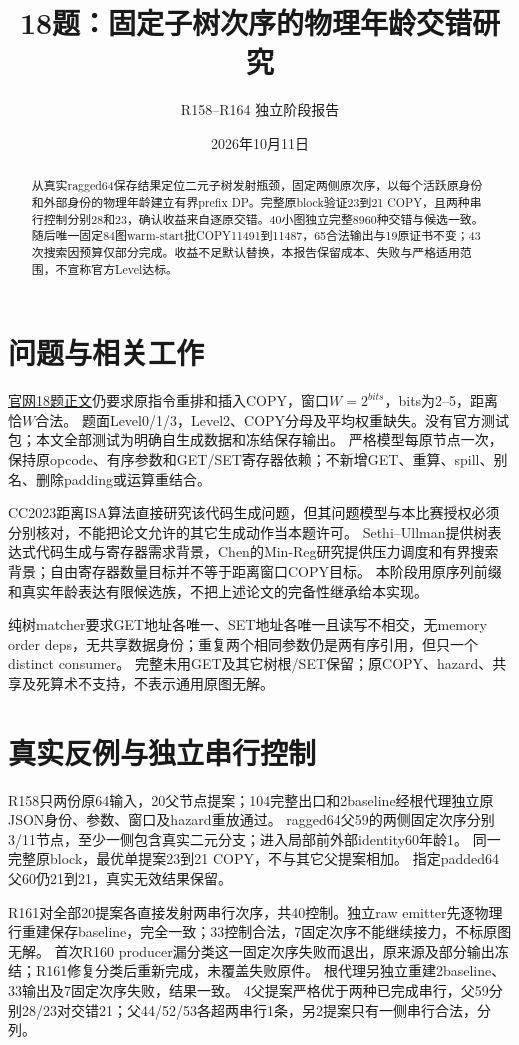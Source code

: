 \documentclass[UTF8,11pt,a4paper]{ctexart}
\title{18题：固定子树次序的物理年龄交错研究}
\author{R158--R164 独立阶段报告}
\date{2026年10月11日}
\begin{document}
\maketitle
\begin{abstract}
从真实ragged64保存结果定位二元子树发射瓶颈，固定两侧原次序，以每个活跃原身份和外部身份的物理年龄建立有界prefix DP。完整原block验证23到21 COPY，且两种串行控制分别28和23，确认收益来自逐原交错。40小图独立完整8960种交错与候选一致。随后唯一固定84图warm-start批COPY11491到11487，65合法输出与19原证书不变；43次搜索因预算仅部分完成。收益不足默认替换，本报告保留成本、失败与严格适用范围，不宣称官方Level达标。
\end{abstract}

\section{问题与相关工作}
\href{https://www.chaspark.com/\#/races/competitions/1326690549003280384}{官网18题正文}仍要求原指令重排和插入COPY，窗口$W=2^{bits}$，bits为2--5，距离恰$W$合法。
题面Level0/1/3，Level2、COPY分母及平均权重缺失。没有官方测试包；本文全部测试为明确自生成数据和冻结保存输出。
严格模型每原节点一次，保持原opcode、有序参数和GET/SET寄存器依赖；不新增GET、重算、spill、别名、删除padding或运算重结合。

CC2023距离ISA算法\cite{sugita}直接研究该代码生成问题，但其问题模型与本比赛授权必须分别核对，不能把论文允许的其它生成动作当本题许可。
Sethi--Ullman\cite{sethi}提供树表达式代码生成与寄存器需求背景，Chen的Min-Reg研究\cite{chen}提供压力调度和有界搜索背景；自由寄存器数量目标并不等于距离窗口COPY目标。
本阶段用原序列前缀和真实年龄表达有限候选族，不把上述论文的完备性继承给本实现。

纯树matcher要求GET地址各唯一、SET地址各唯一且读写不相交，无memory order deps，无共享数据身份；重复两个相同参数仍是两有序引用，但只一个distinct consumer。
完整未用GET及其它树根/SET保留；原COPY、hazard、共享及死算术不支持，不表示通用原图无解。

\section{真实反例与独立串行控制}
R158只两份原64输入，20父节点提案；104完整出口和2baseline经根代理独立原JSON身份、参数、窗口及hazard重放通过。
ragged64父59的两侧固定次序分别3/11节点，至少一侧包含真实二元分支；进入局部前外部identity60年龄1。
同一完整原block，最优单提案23到21 COPY，不与其它父提案相加。
指定padded64父60仍21到21，真实无效结果保留。

R161对全部20提案各直接发射两串行次序，共40控制。独立raw emitter先逐物理行重建保存baseline，完全一致；33控制合法，7固定次序不能继续接力，不标原图无解。
首次R160 producer漏分类这一固定次序失败而退出，原来源及部分输出冻结；R161修复分类后重新完成，未覆盖失败原件。
根代理另独立重建2baseline、33输出及7固定次序失败，结果一致。
4父提案严格优于两种已完成串行，父59分别28/23对交错21；父44/52/53各超两串行1条，另2提案只有一侧串行合法，分列。
\end{document}
